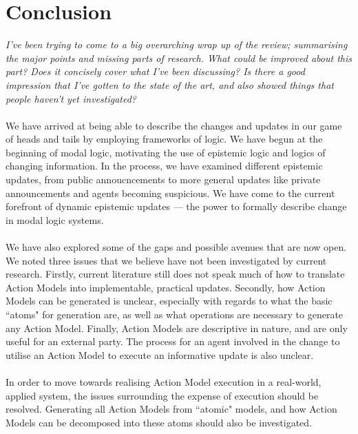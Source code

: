\documentclass[12pt, a4paper, twoside]{article}
\begin{document}
\section{Conclusion} \label{conc}
{\em I've been trying to come to a big overarching wrap up of the review;
	summarising the major points and missing parts of research.
What could be improved about this part?
Does it concisely cover what I've been discussing?
Is there a good impression that I've gotten to the state of the art, and also
showed things that people haven't yet investigated?}\\
\\
We have arrived at being able to describe the changes and updates in our game of
heads and tails by employing frameworks of logic.
We have begun at the beginning of modal logic, motivating the use of epistemic
logic and logics of changing information.
In the process, we have examined different epistemic updates, from public
annoucncements to more general updates like private announcements and agents
becoming suspicious.
We have come to the current forefront of dynamic epistemic updates --- the
power to formally describe change in modal logic systems.\\
\\
We have also explored some of the gaps and possible avenues that are now open.
We noted three issues that we believe have not been investigated by current
research.
Firstly, current literature still does not speak much of how to translate Action Models
into implementable, practical updates.
Secondly, how Action Models can be generated is unclear, especially with regards to what
the basic ``atoms" for generation are, as well as what operations are necessary
to generate any Action Model.
Finally, Action Models are descriptive in nature, and are only useful for an
external party.
The process for an agent involved in the change to utilise an Action Model to
execute an informative update is also unclear.\\
\\
In order to move towards realising Action Model execution in a real-world,
applied system, the issues surrounding the expense of execution should be resolved.
Generating all Action Models from ``atomic" models, and how Action Models can be
decomposed into these atoms should also be investigated.



\end{document}
